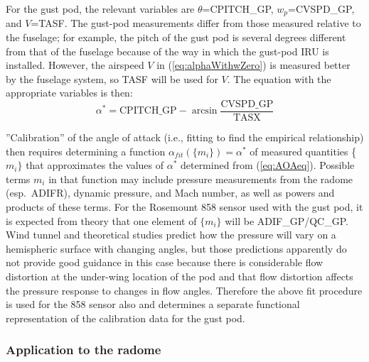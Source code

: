 \documentclass[12pt,twoside,english]{article}\usepackage[]{graphicx}\usepackage[]{color}
\begin{document}
{{For the gust pod, the relevant variables are $\theta$=CPITCH\_GP, $w_{p}$=CVSPD\_GP, and $V$=TASF. The gust-pod measurements differ from those measured relative to the fuselage; for example, the pitch of the gust pod is several degrees different from that of the fuselage because of the way in which the gust-pod IRU is installed. However, the airspeed $V$ in (\ref{eq:alphaWithwZero}) is measured better by the fuselage system, so TASF will be used for $V$. The equation with the appropriate variables is then:  
\begin{equation}
\alpha^{*}=\mathrm{CPITCH\_GP}-\arcsin\frac{\mathrm{CVSPD\_GP}}{\mathrm{TASX}}\label{eq:AOAeq} 
\end{equation}


''Calibration'' of the angle of attack (i.e., fitting to find the empirical relationship) then requires determining a function $\alpha_{fit}(\{m_{i}\})=\alpha^{*}$ of measured quantities \{$m_{i}\}$ that approximates the values of $\alpha^{*}$ determined from (\ref{eq:AOAeq}). Possible terms $m_{i}$ in that function may include pressure measurements from the radome (esp.~ADIFR), dynamic pressure, and Mach number, as well as powers and products of these terms. For the Rosemount 858 sensor used with the gust pod, it is expected from theory that one element of $\{m_{i}\}$ will be ADIF\_GP/QC\_GP\@. Wind tunnel and theoretical studies predict how the pressure will vary on a hemispheric surface with changing angles, but those predictions apparently do not provide good guidance in this case because there is considerable flow distortion at the under-wing location of the pod and that flow distortion affects the pressure response to changes in flow angles. Therefore the above fit procedure is used for the 858 sensor also and determines a separate functional representation of the calibration data for the gust pod. 


\subsubsection{Application to the radome\label{sub:radome-sensitivity}}

}}
\end{document}
